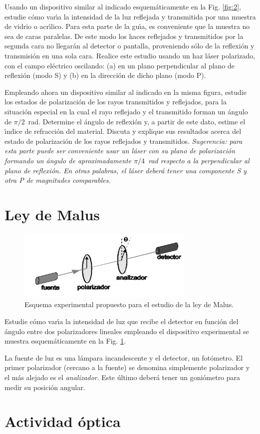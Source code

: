 \documentclass[laboratorio]{guia}
\begin{document}
Usando un dispositivo similar al indicado esquem\'aticamente en la Fig. \ref{fig:2}, 
estudie c\'omo var\'\i a la intensidad de la luz reflejada y transmitida por 
una muestra de vidrio o acr\'\i lico. Para esta parte de la gu\'\i a, es 
conveniente que la muestra no sea de caras paralelas. De este modo los haces
reflejados y transmitidos por la segunda cara no llegar\'an al detector o
pantalla, proveniendo s\'olo de la reflexi\'on y transmisi\'on en una sola 
cara. Realice este estudio usando un haz l\'aser polarizado, con el campo
el\'ectrico oscilando: (a) en un plano perpendicular al plano de reflexi\'on 
(modo S) y (b) en la direcci\'on de dicho plano (modo P).

Empleando ahora un dispositivo similar al indicado en la misma figura, estudie
los estados de polarizaci\'on de los rayos transmitidos y reflejados, para la
situaci\'on especial en la cual el rayo reflejado y el transmitido forman 
un \'angulo de $\pi/2$~rad. Determine el \'angulo de reflexi\'on y, a 
partir de este dato, estime el \'\i ndice de refracci\'on del material. 
Discuta y explique sus resultados acerca del estado de polarizaci\'on de los
rayos reflejados y transmitidos. {\it Sugerencia: para esta parte puede 
ser conveniente usar un l\'aser con su plano de polarizaci\'on formando un
\'angulo de aproximadamente $\pi/4$~rad respecto a la perpendicular al plano
de reflexi\'on. En otras palabras, el l\'aser deber\'a tener una componente
S y otra P de magnitudes comparables. }


\section{Ley de Malus}
\begin{figure}[htb]
    \centering
    \includegraphics[width=8.5cm]{LG12--000.png}
    \caption{Esquema experimental propuesto para el estudio de la ley de Malus.}
    \label{fig:Malus}
\end{figure}

Estudie c\'omo var\'{\i}a la intensidad de luz que recibe el detector en 
funci\'on del \'angulo entre dos polarizadores lineales empleando el 
dispositivo experimental se muestra esquem\'aticamente en la Fig. \ref{fig:Malus}.

La fuente de luz es una l\'ampara incandescente y el detector, un fot\'ometro.
El primer polarizador (cercano a la fuente) se denomina simplemente polarizador
y el m\'as alejado es el {\it analizador}. Este \'ultimo deber\'a tener un 
goni\'ometro para medir su posici\'on angular.


\section{Actividad óptica}



\nocite{Alonso1998,Hecht1986,Jenkins2001}
 

\end{document}
